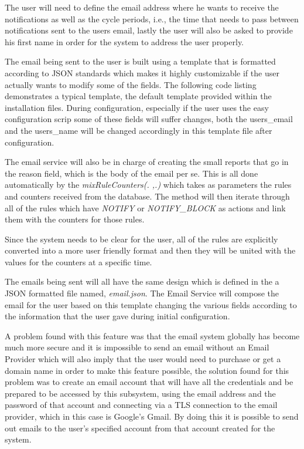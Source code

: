 \begin{enumerate}
The user will need to define the email address where he wants to receive the
notifications as well as the cycle periods, i.e., the time that needs to pass
between notifications sent to the users email, lastly the user will also be
asked to provide his first name in order for the system to address the user
properly.

The email being sent to the user is built using a template that is formatted
according to JSON standards which makes it highly customizable if the user
actually wants to modify some of the fields. The following code listing
demonstrates a typical template, the default template provided within the
installation files. During configuration, especially if the user uses the easy
configuration scrip some of these fields will suffer changes, both the
users\_email and the users\_name will be changed accordingly in this template
file after configuration.

The email service will also be in charge of creating the small reports that go
in the reason field, which is the body of the email per se. This is all done
automatically by the \emph{mixRuleCounters(. ,.)} which takes as parameters the
rules and counters received from the database. The method will then iterate
through all of the rules which have \emph{NOTIFY} or \emph{NOTIFY\_BLOCK} as
actions and link them with the counters for those rules.

Since the system needs to be clear for the user, all of the rules are explicitly
converted into a more user friendly format and then they will be united with the
values for the counters at a specific time.


The emails being sent will all have the same design which is defined in the a
JSON formatted file named, \emph{email.json}. The Email Service will compose the
email for the user based on this template changing the various fields according
to the information that the user gave during initial configuration.

A problem found with this feature was that the email system globally has become
much more secure and it is impossible to send an email without an Email Provider
which will also imply that the user would need to purchase or get a domain name
in order to make this feature possible, the solution found for this problem was
to create an email account that will have all the credentials and be prepared to
be accessed by this subsystem, using the email address and the password of that
account and connecting via a TLS connection to the email provider, which in this
case is Google's Gmail. By doing this it is possible to send out emails to the
user's specified account from that account created for the system.


\end{enumerate}
